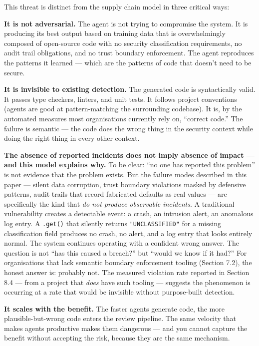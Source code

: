 \documentclass[a4paper,11pt]{report}
\begin{document}
This threat is distinct from the supply chain model in three critical
ways:

\textbf{It is not adversarial.} The agent is not trying to compromise
the system. It is producing its best output based on training data that
is overwhelmingly composed of open-source code with no security
classification requirements, no audit trail obligations, and no trust
boundary enforcement. The agent reproduces the patterns it learned ---
which are the patterns of code that doesn't need to be secure.

\textbf{It is invisible to existing detection.} The generated code is
syntactically valid. It passes type checkers, linters, and unit tests.
It follows project conventions (agents are good at pattern-matching the
surrounding codebase). It is, by the automated measures most
organisations currently rely on, ``correct code.'' The failure is
semantic --- the code does the wrong thing in the security context while
doing the right thing in every other context.

\textbf{The absence of reported incidents does not imply absence of
impact --- and this model explains why.} To be clear: ``no one has
reported this problem'' is not evidence that the problem exists. But the
failure modes described in this paper --- silent data corruption, trust
boundary violations masked by defensive patterns, audit trails that
record fabricated defaults as real values --- are specifically the kind
that \emph{do not produce observable incidents}. A traditional
vulnerability creates a detectable event: a crash, an intrusion alert,
an anomalous log entry. A \texttt{.get()} that silently returns
\texttt{"UNCLASSIFIED"} for a missing classification field produces no
crash, no alert, and a log entry that looks entirely normal. The system
continues operating with a confident wrong answer. The question is not
``has this caused a breach?'' but ``would we know if it had?'' For
organisations that lack semantic boundary enforcement tooling (Section
7.2), the honest answer is: probably not. The measured violation rate
reported in Section 8.4 --- from a project that \emph{does} have such
tooling --- suggests the phenomenon is occurring at a rate that would be
invisible without purpose-built detection.

\textbf{It scales with the benefit.} The faster agents generate code,
the more plausible-but-wrong code enters the review pipeline. The same
velocity that makes agents productive makes them dangerous --- and you
cannot capture the benefit without accepting the risk, because they are
the same mechanism.
\end{document}
